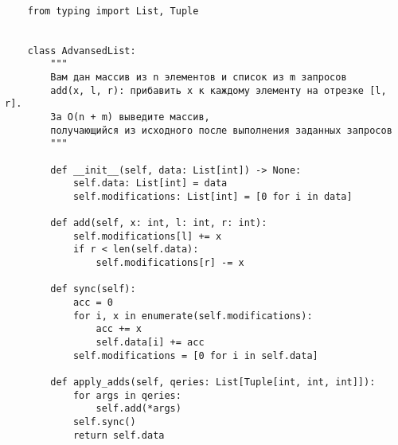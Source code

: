\begin{lstlisting}

	from typing import List, Tuple


	class AdvansedList:
		"""
		Вам дан массив из n элементов и список из m запросов
		add(x, l, r): прибавить x к каждому элементу на отрезке [l, r].
		За O(n + m) выведите массив,
		получающийся из исходного после выполнения заданных запросов
		"""
	
		def __init__(self, data: List[int]) -> None:
			self.data: List[int] = data
			self.modifications: List[int] = [0 for i in data]
	
		def add(self, x: int, l: int, r: int):
			self.modifications[l] += x
			if r < len(self.data):
				self.modifications[r] -= x
	
		def sync(self):
			acc = 0
			for i, x in enumerate(self.modifications):
				acc += x
				self.data[i] += acc
			self.modifications = [0 for i in self.data]
	
		def apply_adds(self, qeries: List[Tuple[int, int, int]]):
			for args in qeries:
				self.add(*args)
			self.sync()
			return self.data
\end{lstlisting}

